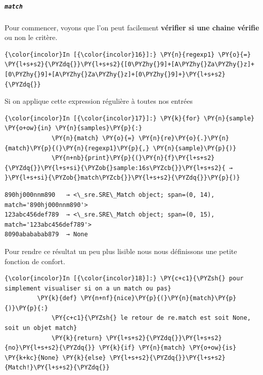     \hypertarget{match}{%
\subparagraph{\texorpdfstring{\texttt{match}}{match}}\label{match}}

    Pour commencer, voyons que l'on peut facilement \textbf{vérifier si une
chaine vérifie} ou non le critère.

    \begin{Verbatim}[commandchars=\\\{\}]
{\color{incolor}In [{\color{incolor}16}]:} \PY{n}{regexp1} \PY{o}{=} \PY{l+s+s2}{\PYZdq{}}\PY{l+s+s2}{[0\PYZhy{}9]+[A\PYZhy{}Za\PYZhy{}z]+[0\PYZhy{}9]+[A\PYZhy{}Za\PYZhy{}z]+[0\PYZhy{}9]+}\PY{l+s+s2}{\PYZdq{}}
\end{Verbatim}


    Si on applique cette expression régulière à toutes nos entrées

    \begin{Verbatim}[commandchars=\\\{\}]
{\color{incolor}In [{\color{incolor}17}]:} \PY{k}{for} \PY{n}{sample} \PY{o+ow}{in} \PY{n}{samples}\PY{p}{:}
             \PY{n}{match} \PY{o}{=} \PY{n}{re}\PY{o}{.}\PY{n}{match}\PY{p}{(}\PY{n}{regexp1}\PY{p}{,} \PY{n}{sample}\PY{p}{)}
             \PY{n+nb}{print}\PY{p}{(}\PY{n}{f}\PY{l+s+s2}{\PYZdq{}}\PY{l+s+si}{\PYZob{}sample:16s\PYZcb{}}\PY{l+s+s2}{ → }\PY{l+s+si}{\PYZob{}match\PYZcb{}}\PY{l+s+s2}{\PYZdq{}}\PY{p}{)}
\end{Verbatim}


    \begin{Verbatim}[commandchars=\\\{\}]
890hj000nnm890   → <\_sre.SRE\_Match object; span=(0, 14), match='890hj000nnm890'>
123abc456def789  → <\_sre.SRE\_Match object; span=(0, 15), match='123abc456def789'>
8090abababab879  → None

    \end{Verbatim}

    Pour rendre ce résultat un peu plus lisible nous nous définissons une
petite fonction de confort.

    \begin{Verbatim}[commandchars=\\\{\}]
{\color{incolor}In [{\color{incolor}18}]:} \PY{c+c1}{\PYZsh{} pour simplement visualiser si on a un match ou pas}
         \PY{k}{def} \PY{n+nf}{nice}\PY{p}{(}\PY{n}{match}\PY{p}{)}\PY{p}{:}
             \PY{c+c1}{\PYZsh{} le retour de re.match est soit None, soit un objet match}
             \PY{k}{return} \PY{l+s+s2}{\PYZdq{}}\PY{l+s+s2}{no}\PY{l+s+s2}{\PYZdq{}} \PY{k}{if} \PY{n}{match} \PY{o+ow}{is} \PY{k+kc}{None} \PY{k}{else} \PY{l+s+s2}{\PYZdq{}}\PY{l+s+s2}{Match!}\PY{l+s+s2}{\PYZdq{}}
\end{Verbatim}


